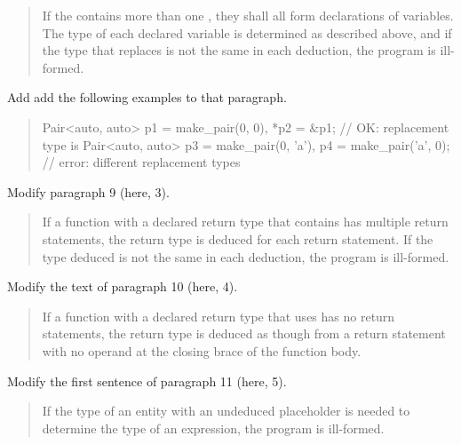 \begin{quote}
\pnum
If the  contains more than one 
, they shall all form declarations of variables.
The type of each declared variable is determined as described above, and if 
the type that replaces  
is not the same in each deduction, the program is ill-formed.
\end{quote}

Add add the following examples to that paragraph.

\begin{quote}
\enterexample
\begin{addedblock}
\begin{codeblock}
Pair<auto, auto> p1 = make_pair(0, 0), 
                 *p2 = &p1;              // OK: replacement type is 
Pair<auto, auto> p3 = make_pair(0, 'a'), 
                 p4 = make_pair('a', 0); // error: different replacement types
\end{codeblock}
\end{addedblock}
\exitexample
\end{quote}

Modify paragraph 9 (here, 3).
\begin{quote}
\pnum
If a function with a declared return type that contains 
has multiple return statements,
the return type is deduced for each return statement. 
If the type deduced is not the same in each deduction,
the program is ill-formed.
\end{quote}

Modify the text of paragraph 10 (here, 4).

\begin{quote}
\pnum
If a function with a declared return type that uses 
has no return statements, the return type is deduced as though from 
a return statement with no operand at the closing brace of the function
body. 
\end{quote}

Modify the first sentence of paragraph 11 (here, 5).

\begin{quote}
\pnum
If the type of an entity with an undeduced placeholder  
is needed to determine the type of an expression, the program is 
ill-formed.
\end{quote}

